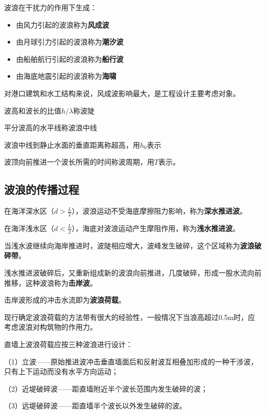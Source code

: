 \documentclass[12pt, a4paper, oneside, UTF8]{ctexbook}
\begin{document}
\begin{definition}
    波浪在干扰力的作用下生成：
    \begin{itemize}
        \item 由风力引起的波浪称为\textbf{风成波}
        \item 由月球引力引起的波浪称为\textbf{潮汐波}
        \item 由船舶航行引起的波浪称为\textbf{船行波}
        \item 由海底地震引起的波浪称为\textbf{海啸}
    \end{itemize}
\end{definition}

对港口建筑和水工结构来说，风成波影响最大，是工程设计主要考虑对象。

\begin{definition}
    波高和波长的比值$h/\lambda$称波陡

    平分波高的水平线称波浪中线

    波浪中线到静止水面的垂直距离称超高，用$h_0$表示

    波顶向前推进一个波长所需的时间称波周期，用$T$表示。
\end{definition}

\subsection{波浪的传播过程}

在海洋深水区（$d > \frac{L}{2}$），波浪运动不受海底摩擦阻力影响，称为\textbf{深水推进波}。

在海洋浅水区（$d < \frac{L}{2}$），海底对波浪运动产生摩阻作用，称为\textbf{浅水推进波}。

当浅水波继续向海岸推进时，波陡相应增大，波峰发生破碎，这个区域称为\textbf{波浪破碎带}。

浅水推进波破碎后，又重新组成新的波浪向前推进，几度破碎，形成一股水流向前推移，这种波浪称为\textbf{击岸波}。

击岸波形成的冲击水流即为\textbf{波浪荷载}。

现行确定波浪荷载的方法带有很大的经验性，一般情况下当浪高超过0.5m时，应考虑波浪对构筑物的作用力。

\begin{corollary}
    直墙上波浪荷载应按三种波浪进行设计：

（1）立波——原始推进波冲击垂直墙面后和反射波互相叠加形成的一种干涉波，只有上下运动而没有水平方向运动；

（2）近堤破碎波——距直墙附近半个波长范围内发生破碎的波；

（3）远堤破碎波——距直墙半个波长以外发生破碎的波。
\end{corollary}
\end{document}
